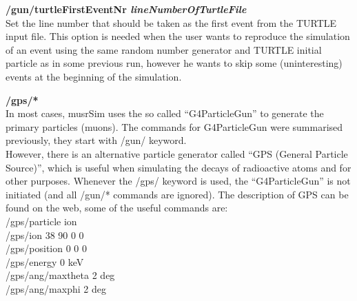 \documentclass[twoside]{dis04}
\begin{document}
\begin{description}
\item{\bf /gun/turtleFirstEventNr \emph{lineNumberOfTurtleFile} }\\
	Set the line number that should be taken as the first event from the TURTLE input file.
	This option is needed when the user wants to reproduce the simulation of an event
        using the same random number generator and TURTLE initial particle as in some previous
        run, however he wants to skip some (uninteresting) events at the beginning of the simulation.

\item{\bf /gps/*} \\
	In most cases, musrSim uses the so called ``G4ParticleGun'' to generate the primary
	particles (muons).  The commands for G4ParticleGun were summarised previously, 
	they start with /gun/ keyword.\\
	However, there is an alternative particle generator
	called ``GPS (General Particle Source)'', which is useful when simulating
	the decays of radioactive atoms and for other purposes.
	Whenever the /gps/ keyword is used, the ``G4ParticleGun'' is not initiated
	(and all /gun/* commands are ignored).
	The description of GPS can be found on the web, some of the useful commands are:\\
	/gps/particle ion\\
	/gps/ion 38 90 0 0\\
	/gps/position 0 0 0\\
	/gps/energy 0 keV\\
	/gps/ang/maxtheta 2 deg\\
	/gps/ang/maxphi 2 deg\\

\end{description}

\end{document}
